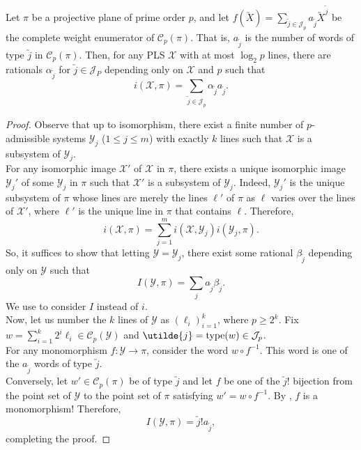 	\begin{ftheo}
		\label{theo: linear combination of cwe coeffs}
		Let $\pi$ be a projective plane of prime order $p$, and let $f(\utilde{X}) = \sum_{\utilde{j} \in \mathcal{J}_p} a_{\utilde{j}} \utilde{X}^{\utilde{j}}$ be the complete weight enumerator of $\mathcal{C}_p(\pi)$. That is, $a_{\utilde{j}}$ is the number of words of type $\utilde{j}$ in $\mathcal{C}_p(\pi)$. Then, for any PLS $\mathcal{X}$ with at most $\log_2 p$ lines, there are rationals $\alpha_{\utilde{j}}$ for $\utilde{j} \in \mathcal{J}_P$ depending only on $\mathcal{X}$ and $p$ such that
		\[ i(\mathcal{X},\pi) = \sum_{\utilde{j} \in \mathcal{J}_p} \alpha_{\utilde{j}} a_{\utilde{j}}. \]
	\end{ftheo}
	\begin{proof}
		Observe that up to isomorphism, there exist a finite number of $p$-admissible systems $\mathcal{Y}_j$ ($1 \le j \le m$) with exactly $k$ lines such that $\mathcal{X}$ is a subsystem of $\mathcal{Y}_j$.\\
		For any isomorphic image $\mathcal{X}'$ of $\mathcal{X}$ in $\pi$, there exists a unique isomorphic image $\mathcal{Y}_j'$ of some $\mathcal{Y}_j$ in $\pi$ such that $\mathcal{X}'$ is a subsystem of $\mathcal{Y}_j$. Indeed, $\mathcal{Y}_j'$ is the unique subsystem of $\pi$ whose lines are merely the lines $\ell'$ of $\pi$ as $\ell$ varies over the lines of $\mathcal{X}'$, where $\ell'$ is the unique line in $\pi$ that contains $\ell$. Therefore,
		\[ i(\mathcal{X},\mathcal{\pi}) = \sum_{j=1}^m i(\mathcal{X},\mathcal{Y}_j) i(\mathcal{Y}_j,\pi). \]
		So, it suffices to show that letting $\mathcal{Y} = \mathcal{Y}_j$, there exist some rational $\beta_{\utilde{j}}$ depending only on $\mathcal{Y}$ such that
		\[ I(\mathcal{Y},\pi) = \sum_j a_{\utilde{j}} \beta_{\utilde{j}}. \]
		We use  to consider $I$ instead of $i$.\\
		Now, let us number the $k$ lines of $\mathcal{Y}$ as $(\ell_i)_{i=1}^k$, where $p \ge 2^k$. Fix $w = \sum_{i=1}^k 2^i \ell_i \in \mathcal{C}_p(\mathcal{Y})$ and $\utilde{j} = \type(w) \in \mathcal{J}_p$.\\
		For any monomorphism $f : \mathcal{Y} \to \pi$, consider the word $w \circ f^{-1}$. This word is one of the $a_{\utilde{j}}$ words of type $\utilde{j}$.\\
		Conversely, let $w' \in \mathcal{C}_p(\pi)$ be of type $\utilde{j}$ and let $f$ be one of the $\utilde{j}!$ bijection from the point set of $\mathcal{Y}$ to the point set of $\pi$ satisfying $w' = w \circ f^{-1}$. By , $f$ is a monomorphism! Therefore,
		\[ I(\mathcal{Y},\pi) = \utilde{j}! a_{\utilde{j}}, \]
		completing the proof.
	\end{proof}

